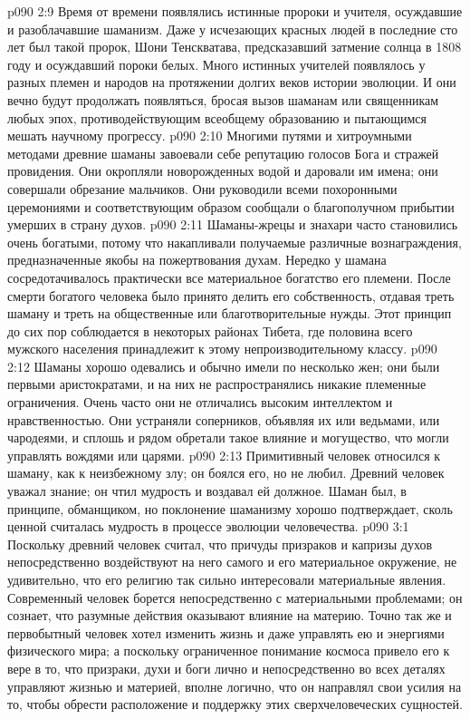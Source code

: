 \vs p090 2:9 Время от времени появлялись истинные пророки и учителя, осуждавшие и разоблачавшие шаманизм. Даже у исчезающих красных людей в последние сто лет был такой пророк, Шони Тенскватава, предсказавший затмение солнца в 1808 году и осуждавший пороки белых. Много истинных учителей появлялось у разных племен и народов на протяжении долгих веков истории эволюции. И они вечно будут продолжать появляться, бросая вызов шаманам или священникам любых эпох, противодействующим всеобщему образованию и пытающимся мешать научному прогрессу.
\vs p090 2:10 Многими путями и хитроумными методами древние шаманы завоевали себе репутацию голосов Бога и стражей провидения. Они окропляли новорожденных водой и даровали им имена; они совершали обрезание мальчиков. Они руководили всеми похоронными церемониями и соответствующим образом сообщали о благополучном прибытии умерших в страну духов.
\vs p090 2:11 Шаманы\hyp{}жрецы и знахари часто становились очень богатыми, потому что накапливали получаемые различные вознаграждения, предназначенные якобы на пожертвования духам. Нередко у шамана сосредотачивалось практически все материальное богатство его племени. После смерти богатого человека было принято делить его собственность, отдавая треть шаману и треть на общественные или благотворительные нужды. Этот принцип до сих пор соблюдается в некоторых районах Тибета, где половина всего мужского населения принадлежит к этому непроизводительному классу.
\vs p090 2:12 Шаманы хорошо одевались и обычно имели по несколько жен; они были первыми аристократами, и на них не распространялись никакие племенные ограничения. Очень часто они не отличались высоким интеллектом и нравственностью. Они устраняли соперников, объявляя их или ведьмами, или чародеями, и сплошь и рядом обретали такое влияние и могущество, что могли управлять вождями или царями.
\vs p090 2:13 Примитивный человек относился к шаману, как к неизбежному злу; он боялся его, но не любил. Древний человек уважал знание; он чтил мудрость и воздавал ей должное. Шаман был, в принципе, обманщиком, но поклонение шаманизму хорошо подтверждает, сколь ценной считалась мудрость в процессе эволюции человечества.
\vs p090 3:1 Поскольку древний человек считал, что причуды призраков и капризы духов непосредственно воздействуют на него самого и его материальное окружение, не удивительно, что его религию так сильно интересовали материальные явления. Современный человек борется непосредственно с материальными проблемами; он сознает, что разумные действия оказывают влияние на материю. Точно так же и первобытный человек хотел изменить жизнь и даже управлять ею и энергиями физического мира; а поскольку ограниченное понимание космоса привело его к вере в то, что призраки, духи и боги лично и непосредственно во всех деталях управляют жизнью и материей, вполне логично, что он направлял свои усилия на то, чтобы обрести расположение и поддержку этих сверхчеловеческих сущностей.
